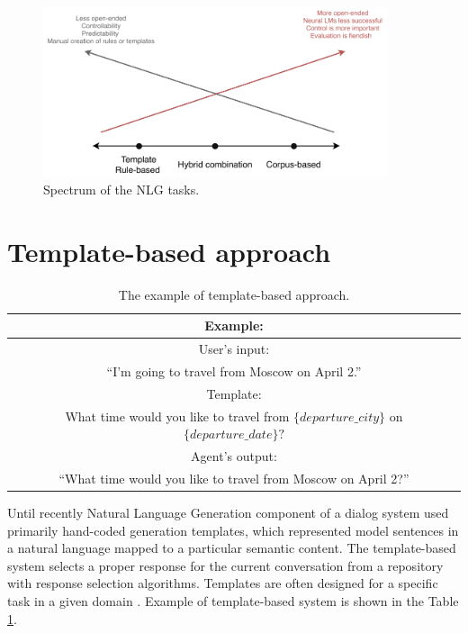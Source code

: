 \begin{figure}[hbt]
  \centering
  \includegraphics[width=0.9\textwidth]{figures/templateVScorpus.pdf}
  \caption{Spectrum of the NLG tasks.}
  \label{nlg_spectum}
\end{figure}

\section{Template-based approach} 

\begin{table}[ht]
\centering
 \begin{tabular}{|c|} 
 \hline
 Example: \\
 \hline
 User's input: \\
 ``I'm going to travel from Moscow on April 2.'' \\ 
 \hline
 Template: \\
 What time would you like to travel from $\{departure\_city\}$ on $\{departure\_date\}?$ \\
 \hline
 Agent's output:\\
 ``What time would you like to travel from Moscow on April 2?'' \\
 \hline
 \end{tabular}
 \caption{The example of template-based approach.}
\label{tab:tb_example}
\end{table}

Until recently Natural Language Generation component of a dialog system used primarily hand-coded generation templates, which represented model sentences in a natural language mapped to a particular semantic content.
The template-based system selects a proper response for the current conversation from a repository with response selection algorithms. Templates are often designed for a specific task in a given domain \cite{manishina2016data}. 
Example of template-based system is shown in the Table \ref{tab:tb_example}.


